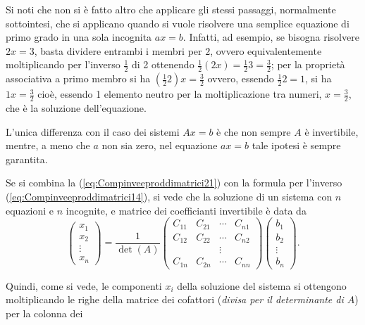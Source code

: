 \begin{oss}
  \label{oss:Compinveeproddimatrici6}
  Si noti che non si è fatto altro che applicare gli stessi passaggi, normalmente sottointesi, che
  si applicano quando si vuole risolvere una semplice equazione di primo grado in una sola incognita
  $ax=b$. Infatti, ad esempio, se bisogna risolvere $2x=3$, basta dividere entrambi i membri per $2$,
  ovvero equivalentemente moltiplicando per l'inverso $\frac{1}{2}$ di 2 ottenendo
  $\frac{1}{2}(2x)=\frac{1}{2}3=\frac{3}{2}$; per la proprietà associativa a primo membro si ha
  $(\frac{1}{2}2)x=\frac{3}{2}$ ovvero, essendo $\frac{1}{2}2=1$, si ha $1x=\frac{3}{2}$ cioè, essendo 1
  elemento neutro per la moltiplicazione tra numeri, $x=\frac{3}{2}$, che è la soluzione dell'equazione.

  L'unica differenza con il caso dei sistemi $Ax=b$ è che non sempre $A$ è invertibile, mentre, a meno
  che $a$ non sia zero, nel equazione $ax=b$ tale ipotesi è sempre garantita.

  Se si combina la (\ref{eq:Compinveeproddimatrici21}) con la formula per l'inverso
  (\ref{eq:Compinveeproddimatrici14}), si vede che la soluzione di un sistema con $n$ equazioni e $n$
  incognite, e matrice dei coefficianti invertibile è data da
  \begin{equation}
    \label{eq:Compinveeproddimatrici22}
    \begin{pmatrix}
      x_{1}\\
      x_2\\
      \vdots\\
      x_n
    \end{pmatrix}=\frac{1}{\det(A)}
    \begin{pmatrix}
      C_{11} & C_{21} & \cdots & C_{n1}\\
      C_{12} & C_{22} & \cdots & C_{n2}\\
             && \vdots \\
      C_{1n} & C_{2n} & \cdots & C_{nn}
    \end{pmatrix}
    \begin{pmatrix}
      b_1\\
      b_2\\
      \vdots\\
      b_n
    \end{pmatrix}.
  \end{equation}
\end{oss}
Quindi, come si vede, le componenti $x_i$ della soluzione del sistema si ottengono moltiplicando le
righe della matrice dei cofattori (\textit{divisa per il determinante di $A$}) per la colonna dei

